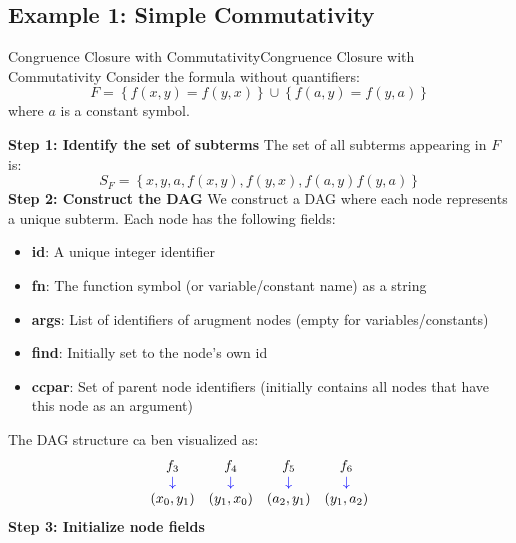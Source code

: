 \documentclass[a4paper]{article}
\theoremstyle{definition}
\begin{document}
\subsection{Example 1: Simple Commutativity}
\begin{example}{Congruence Closure with Commutativity}{Congruence Closure with Commutativity}
Consider the formula without quantifiers:
\[
  F = \left\{ f(x,y) = f(y,x) \right\} \cup \left\{ f(a,y) = f(y,a) \right\}
\]
where \( a \) is a constant symbol.
\end{example}
\textbf{Step 1: Identify the set of subterms}
\vspace{1em}
\noindent
\newline
The set of all subterms appearing in \( F \) is:
\[
  S_F = \left\{ x,y,a,f(x,y),f(y,x),f(a,y)f(y,a) \right\}
\]
\textbf{Step 2: Construct the DAG}
\vspace{1em}
\noindent 
\newline
We construct a DAG where each node represents a unique subterm. Each node has the following fields:
\begin{itemize}
	\item \textbf{id}: A unique integer identifier 
	\item \textbf{fn}: The function symbol (or variable/constant name) as a string 
	\item \textbf{args}: List of identifiers of arugment nodes (empty for variables/constants)
	\item \textbf{find}: Initially set to the node's own id 
	\item \textbf{ccpar}: Set of parent node identifiers (initially contains all nodes that have this node as an argument)
\end{itemize}
The DAG structure ca ben visualized as:
\[
\begin{array}{cccc}
	f_3 & f_4 & f_5 & f_6 \\
	\textcolor{blue}{\downarrow} & \textcolor{blue}{\downarrow} & \textcolor{blue}{\downarrow} & \textcolor{blue}{\downarrow} \\
	(x_0, y_1) & (y_1, x_0) & (a_2, y_1) & (y_1, a_2) 
\end{array}
\]
\textbf{Step 3: Initialize node fields}
\end{document}
